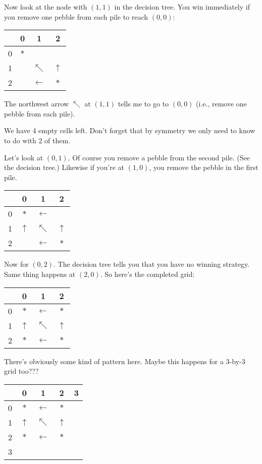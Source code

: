 Now look at the node with $(1,1)$ in the decision tree.
You win immediately if you remove one pebble from 
each pile to reach $(0,0)$:
\begin{longtable}{|c|ccc|} \hline
  & 0   & 1 & 2 \\ \hline
0 & $*$ &   &  \\
1 &     & $\nwarrow$&  $\uparrow$ \\
2 &     & $\leftarrow$  &  $*$ \\
\hline
\end{longtable}
The northwest arrow $\nwarrow$ at $(1,1)$ tells me to go to
$(0,0)$ (i.e., remove one pebble from each pile).

We have 4 empty cells left. 
Don't forget that by symmetry we only need to know to do with 2 of them.

Let's look at $(0,1)$.
Of course you remove a pebble from the second pile.
(See the decision tree.)
Likewise if you're at $(1,0)$, you remove the pebble in the first pile.
\begin{longtable}{|c|ccc|} \hline
  & 0   & 1 & 2 \\ \hline
0 & $*$ & $\leftarrow$  &  \\
1 & $\uparrow$    & $\nwarrow$&  $\uparrow$ \\
2 &     & $\leftarrow$  &  $*$ \\
\hline
\end{longtable}

Now for $(0,2)$.
The decision tree tells you that you have no winning strategy.
Same thing happens at $(2,0)$.
So here's the completed grid:
\begin{longtable}{|c|ccc|} \hline
  & 0   & 1 & 2 \\ \hline
0 & $*$ & $\leftarrow$  &  $*$ \\
1 & $\uparrow$    & $\nwarrow$&  $\uparrow$ \\
2 & $*$ & $\leftarrow$  &  $*$ \\
\hline
\end{longtable}
There's obviously some kind of pattern here.
Maybe this happens for a 3-by-3 grid too???
\begin{longtable}{|c|cccc|} \hline
  & 0   & 1 & 2 & 3\\ \hline
0 & $*$ & $\leftarrow$  &  $*$ & \\
1 & $\uparrow$    & $\nwarrow$&  $\uparrow$ & \\
2 & $*$ & $\leftarrow$  &  $*$ & \\
3 &     &               &      & \\ \hline
\end{longtable}

